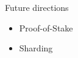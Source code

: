 \begin{frame}{Future directions}
    \begin{itemize}
        \item Proof-of-Stake
        \item Sharding
    \end{itemize}
\end{frame}
